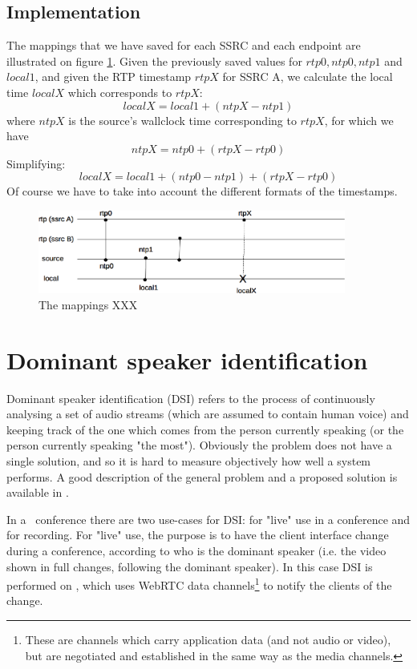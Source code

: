 \documentclass[twoside,openright,a4paper,12pt,english]{article}
\begin{document}
\subsection{Implementation}
The mappings that we have saved for each SSRC and each endpoint are illustrated
on figure \ref{diagram-sync}. Given the previously saved values for $rtp0,
ntp0, ntp1$ and $local1$, and given the RTP timestamp $rtpX$ for SSRC A, we calculate the local
time $localX$ which corresponds to $rtpX$:
$$localX = local1 + (ntpX - ntp1)$$ 
where $ntpX$ is the source's wallclock time corresponding to $rtpX$, for which we have
$$ntpX = ntp0 + (rtpX - rtp0)$$
Simplifying: $$localX = local1 + (ntp0 - ntp1) + (rtpX - rtp0)$$
Of course we have to take into account the different formats of the timestamps.

\begin{figure}[h]
    \includegraphics[width=0.9\textwidth]{./pics/diagram-sync.eps}
    \caption{The mappings XXX}
    \label{diagram-sync}
\end{figure}





\section{Dominant speaker identification}
\label{dsd}
Dominant speaker identification (DSI) refers to the process of continuously analysing a set of audio streams
(which are assumed to contain human voice) and keeping track of the one which
comes from the person currently speaking (or the person currently speaking "the
most"). Obviously the problem does not have a single solution, and so it is hard
to measure objectively how well a system performs. A good description of the
general problem and a proposed solution is available in \cite{volfin2012}. 

In a \jm\ conference there are two use-cases for DSI: for "live" use in a
conference and for recording. 
For "live" use, the purpose is to have the client interface change during a
conference, according to who is the dominant speaker (i.e. the video shown in
full changes, following the dominant speaker). In this case DSI is performed
on \jvb, which uses WebRTC data channels\footnote{These are channels which
carry application data (and not audio or video), but are negotiated and
established in the same way as the media channels.}
to notify the clients of the change.
\end{document}
